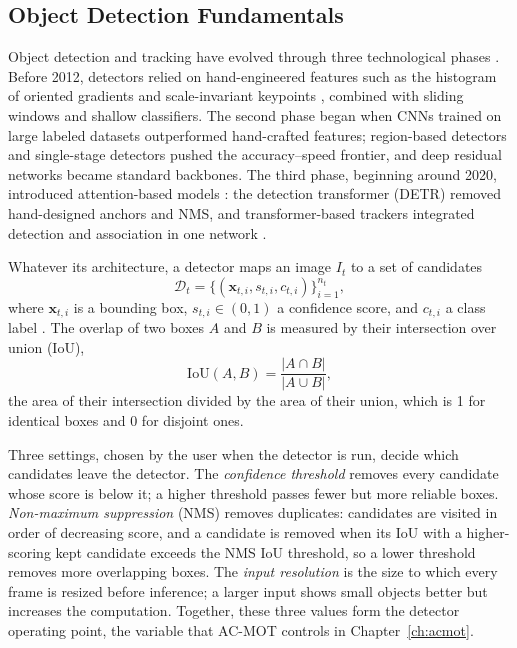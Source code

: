 \subsection{Object Detection Fundamentals}\label{sec:bg-detection}
Object detection and tracking have evolved through three technological phases \cite{li2025motreview,ismail2026realtime}. Before 2012, detectors relied on hand-engineered features such as the histogram of oriented gradients \cite{dalal2005hog} and scale-invariant keypoints \cite{lowe2004sift}, combined with sliding windows and shallow classifiers. The second phase began when CNNs trained on large labeled datasets \cite{krizhevsky2017alexnet,russakovsky2015imagenet} outperformed hand-crafted features; region-based detectors \cite{girshick2014rcnn,ren2017fasterrcnn} and single-stage detectors \cite{redmon2016yolo,liu2016ssd} pushed the accuracy--speed frontier, and deep residual networks \cite{he2016resnet} became standard backbones. The third phase, beginning around 2020, introduced attention-based models \cite{vaswani2017attention,dosovitskiy2021vit}: the detection transformer (DETR) \cite{carion2020detr} removed hand-designed anchors and NMS, and transformer-based trackers integrated detection and association in one network \cite{sun2020transtrack,meinhardt2022trackformer,zeng2022motr}.

Whatever its architecture, a detector maps an image $I_t$ to a set of candidates
\begin{equation}
\mathcal{D}_t = \{(\mathbf{x}_{t,i}, s_{t,i}, c_{t,i})\}_{i=1}^{n_t},
\label{eq:bg-dets}
\end{equation}
where $\mathbf{x}_{t,i}$ is a bounding box, $s_{t,i}\in(0,1)$ a confidence score, and $c_{t,i}$ a class label \cite{ismail2026realtime}. The overlap of two boxes $A$ and $B$ is measured by their intersection over union (IoU),
\begin{equation}
\mathrm{IoU}(A,B)=\frac{|A\cap B|}{|A\cup B|},
\label{eq:bg-iou}
\end{equation}
the area of their intersection divided by the area of their union, which is 1 for identical boxes and 0 for disjoint ones.

Three settings, chosen by the user when the detector is run, decide which candidates leave the detector. The \emph{confidence threshold} removes every candidate whose score is below it; a higher threshold passes fewer but more reliable boxes. \emph{Non-maximum suppression} (NMS) removes duplicates: candidates are visited in order of decreasing score, and a candidate is removed when its IoU with a higher-scoring kept candidate exceeds the NMS IoU threshold, so a lower threshold removes more overlapping boxes. The \emph{input resolution} is the size to which every frame is resized before inference; a larger input shows small objects better but increases the computation. Together, these three values form the detector operating point, the variable that AC-MOT controls in Chapter~\ref{ch:acmot}.

